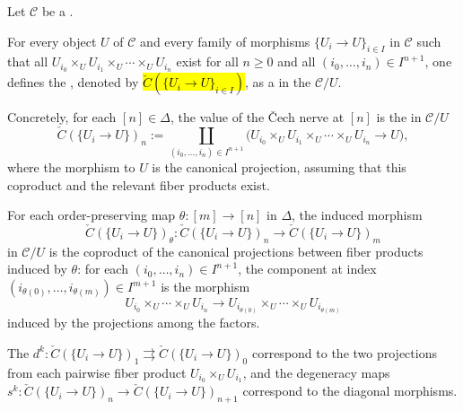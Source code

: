 \begin{definition} \label{definition:cech_nerve_of_a_family_of_morphisms_to_an_object_in_a_category}

    Let $\mathcal{C}$ be a .

    For every object $U$ of $\mathcal{C}$ and every family of morphisms $\{U_i \to U\}_{i \in I}$ in $\mathcal{C}$ such that all  $U_{i_0} \times_U U_{i_1} \times_U \cdots \times_U U_{i_n}$ exist for all $n \ge 0$ and all $(i_0,\ldots,i_n) \in I^{n+1}$, one defines the , denoted by \hl{$\check{C}(\{U_i \to U\}_{i \in I})$}, as a  in the  $\mathcal{C}/U$.

    Concretely, for each $[n] \in \Delta$, the value of the \v{C}ech nerve at $[n]$ is the  in $\mathcal{C}/U$
    $$\check{C}(\{U_i \to U\})_n := \coprod_{(i_0,\ldots,i_n) \in I^{n+1}} \big(U_{i_0} \times_U U_{i_1} \times_U \cdots \times_U U_{i_n} \longrightarrow U\big),$$
    where the morphism to $U$ is the canonical projection, assuming that this coproduct and the relevant fiber products exist.

    For each order-preserving map $\theta: [m] \to [n]$ in $\Delta$, the induced morphism
    $$\check{C}(\{U_i \to U\})_\theta : \check{C}(\{U_i \to U\})_n \longrightarrow \check{C}(\{U_i \to U\})_m$$
    in $\mathcal{C}/U$ is the coproduct of the canonical projections between fiber products induced by $\theta$: for each $(i_0,\ldots,i_n) \in I^{n+1}$, the component at index $(i_{\theta(0)},\ldots,i_{\theta(m)}) \in I^{m+1}$ is the morphism
    $$U_{i_0} \times_U \cdots \times_U U_{i_n} \longrightarrow U_{i_{\theta(0)}} \times_U \cdots \times_U U_{i_{\theta(m)}}$$
    induced by the projections among the factors.

    The  $d^k: \check{C}(\{U_i \to U\})_1 \rightrightarrows \check{C}(\{U_i \to U\})_0$ correspond to the two projections from each pairwise fiber product $U_{i_0} \times_U U_{i_1}$, and the degeneracy maps $s^k: \check{C}(\{U_i \to U\})_n \to \check{C}(\{U_i \to U\})_{n+1}$ correspond to the diagonal morphisms.


\end{definition}
